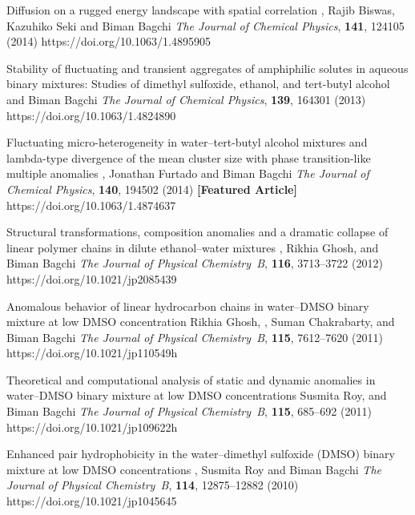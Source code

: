 %
        {Diffusion on a rugged energy landscape with spatial correlation}
        {\selfauthor{}, Rajib Biswas, Kazuhiko Seki and Biman Bagchi}
        {{\slshape The Journal of Chemical Physics}, {\bfseries 141}, 124105 (2014)}
        {https://doi.org/10.1063/1.4895905}


%
        {Stability of fluctuating and transient aggregates of amphiphilic solutes
        in aqueous binary mixtures: Studies of dimethyl sulfoxide, ethanol, and tert-butyl alcohol}
        {\selfauthor{} and Biman Bagchi}
        {{\slshape The Journal of Chemical Physics}, {\bfseries 139}, 164301 (2013)}
        {https://doi.org/10.1063/1.4824890}

%
        {Fluctuating micro-heterogeneity in water--tert-butyl alcohol mixtures and
        lambda-type divergence of the mean cluster size with phase transition-like
        multiple anomalies}
        {\selfauthor{}, Jonathan Furtado and Biman Bagchi}
        {{\slshape The Journal of Chemical Physics}, {\bfseries 140}, 194502 (2014) {\bfseries [Featured Article]}}
        {https://doi.org/10.1063/1.4874637}

%
        {Structural transformations, composition anomalies and a dramatic
        collapse of linear polymer chains in dilute ethanol--water mixtures}
        {\selfauthor{}, Rikhia Ghosh, and Biman Bagchi}
        {{\slshape The Journal of Physical Chemistry~B}, {\bfseries 116}, 3713--3722 (2012)}
        {https://doi.org/10.1021/jp2085439}

%
        {Anomalous behavior of linear hydrocarbon chains in water--DMSO
        binary mixture at low DMSO concentration}
        {Rikhia Ghosh, \selfauthor{}, Suman Chakrabarty, and Biman Bagchi}
        {{\slshape The Journal of Physical Chemistry~B}, {\bfseries 115}, 7612--7620 (2011)}
        {https://doi.org/10.1021/jp110549h}

%
        {Theoretical and computational analysis of static and dynamic anomalies
        in water--DMSO binary mixture at low DMSO concentrations}
        {Susmita Roy, \selfauthor{} and Biman Bagchi}
        {{\slshape The Journal of Physical Chemistry~B}, {\bfseries 115}, 685--692 (2011)}
        {https://doi.org/10.1021/jp109622h}

%
        {Enhanced pair hydrophobicity in the water--dimethyl sulfoxide (DMSO)
        binary mixture at low DMSO concentrations}
        {\selfauthor{}, Susmita Roy and Biman Bagchi}
        {{\slshape The Journal of Physical Chemistry~B}, {\bfseries 114}, 12875--12882 (2010)}
        {https://doi.org/10.1021/jp1045645}
